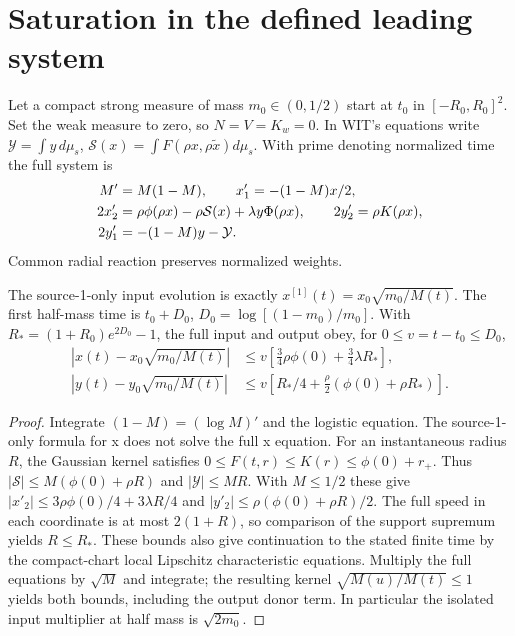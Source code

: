 \documentclass[11pt]{article}
\begin{document}
\section{Saturation in the defined leading system}\label{an04cfsv1:leading}
Let a compact strong measure of mass \(m_0\in(0,1/2)\) start at \(t_0\)
in \([-R_0,R_0]^2\). Set the weak measure to zero, so \(N=V=K_w=0\).
In WIT's equations write \(\mathcal Y=\int y\,d\mu_s\),
\(\mathcal S(x)=\int F(\rho x,\rho\widetilde x)d\mu_s\).
With prime denoting normalized time the full system is
\begin{align}
 M'&=M(1-M),\qquad x'_1=-(1-M)x/2,\notag\\
 2x'_2&=\rho\phi(\rho x)-\rho\mathcal S(x)+\lambda y\Phi(\rho x),
 \qquad 2y'_2=\rho K(\rho x),\notag\\
 2y'_1&=-(1-M)y-\mathcal Y .
 \label{an04cfsv1:field}
\end{align}
Common radial reaction preserves normalized weights.
\begin{lemma}\label{an04cfsv1:sat}
The source-1-only input evolution is exactly \(x^{[1]}(t)
=x_0\sqrt{m_0/M(t)}\). The first half-mass time is \(t_0+D_0\),
\(D_0=\log[(1-m_0)/m_0]\). With
\(R_*=(1+R_0)e^{2D_0}-1\), the full input and output obey,
for \(0\le v=t-t_0\le D_0\),
\begin{align*}
 |x(t)-x_0\sqrt{m_0/M(t)}|
 &\le v\left[\tfrac34\rho\phi(0)+\tfrac34\lambda R_*\right],\\
 |y(t)-y_0\sqrt{m_0/M(t)}|
 &\le v\left[R_*/4+\tfrac\rho2(\phi(0)+\rho R_*)\right].
\end{align*}
\end{lemma}
\begin{proof}
Integrate \((1-M)=(\log M)'\) and the logistic equation.
The source-1-only formula for x does not solve the full x equation.
For an instantaneous radius \(R\), the Gaussian kernel satisfies
\(0\le F(t,r)\le K(r)\le\phi(0)+r_+\).
Thus \(|\mathcal S|\le M(\phi(0)+\rho R)\) and
\(|\mathcal Y|\le MR\). With \(M\le1/2\) these give
\(|x'_2|\le3\rho\phi(0)/4+3\lambda R/4\) and
\(|y'_2|\le\rho(\phi(0)+\rho R)/2\). The full speed in each coordinate
is at most \(2(1+R)\), so comparison of the support supremum yields
\(R\le R_*\). These bounds also give continuation to the stated finite
time by the compact-chart local Lipschitz characteristic equations.
Multiply the full equations by \(\sqrt M\) and integrate; the resulting
kernel \(\sqrt{M(u)/M(t)}\le1\) yields both bounds, including the
output donor term. In particular the isolated input multiplier at
half mass is \(\sqrt{2m_0}\).
\end{proof}
\end{document}
